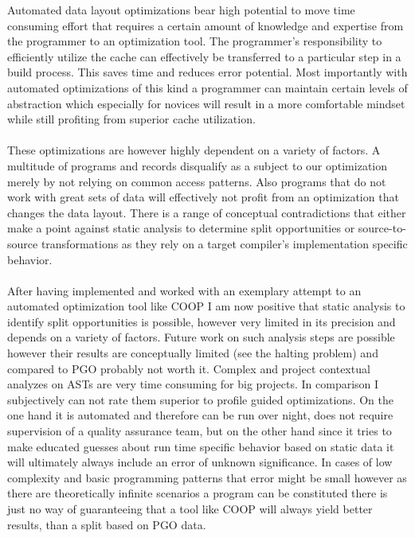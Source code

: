 Automated data layout optimizations bear high potential to move time consuming effort that requires a certain amount of knowledge and expertise from the programmer to an optimization tool. The programmer's responsibility to efficiently utilize the cache can effectively be transferred to a particular step in a build process. This saves time and reduces error potential. Most importantly with automated optimizations of this kind a programmer can maintain certain levels of abstraction which especially for novices will result in a more comfortable mindset while still profiting from superior cache utilization.\\\\
These optimizations are however highly dependent on a variety of factors. A multitude of programs and records disqualify as a subject to our optimization merely by not relying on common access patterns. Also programs that do not work with great sets of data will effectively not profit from an optimization that changes the data layout. There is a range of conceptual contradictions that either make a point against static analysis to determine split opportunities or source-to-source transformations as they rely on a target compiler's implementation specific behavior.\\\\
After having implemented and worked with an exemplary attempt to an automated optimization tool like COOP I am now positive that static analysis to identify split opportunities is possible, however very limited in its precision and depends on a variety of factors. Future work on such analysis steps are possible however their results are conceptually limited (see the halting problem) and compared to PGO probably not worth it. Complex and project contextual analyzes on ASTs are very time consuming for big projects. In comparison I subjectively can not rate them superior to profile guided optimizations. On the one hand it is automated and therefore can be run over night, does not require supervision of a quality assurance team, but on the other hand since it tries to make educated guesses about run time specific behavior based on static data it will ultimately always include an error of unknown significance. In cases of low complexity and basic programming patterns that error might be small however as there are theoretically infinite scenarios a program can be constituted there is just no way of guaranteeing that a tool like COOP will always yield better results, than a split based on PGO data.\\
